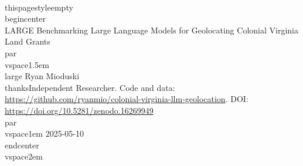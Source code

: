 \\thispagestyle{empty}
\\begin{center}
{\\LARGE Benchmarking Large Language Models for Geolocating Colonial Virginia Land Grants\\par}
\\vspace{1.5em}
{\\large Ryan Mioduski\\thanks{Independent Researcher. Code and data: \url{https://github.com/ryanmio/colonial-virginia-llm-geolocation}. DOI: \url{https://doi.org/10.5281/zenodo.16269949}}\\par}
\\vspace{1em}
2025-05-10
\\end{center}
\\vspace{2em}
